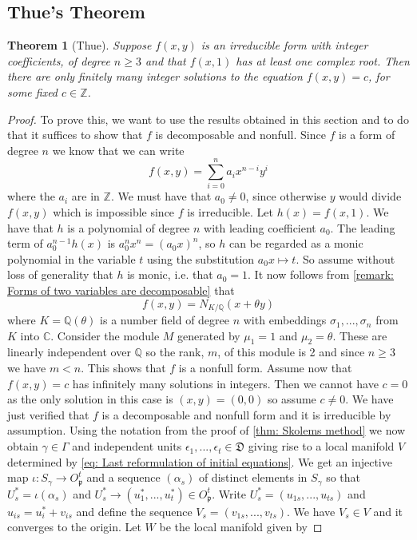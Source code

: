\documentclass{article}
\newtheorem{theorem}{Theorem}[section]
\newcommand{\mfrak}[1]{\mathfrak{#1}}
\newcommand{\mbb}[1]{\mathbb{#1}}
\numberwithin{equation}{section}
\begin{document}

\subsection{Thue's Theorem}

\begin{theorem}[Thue]\label{thm: Thues theorem}
    Suppose $f(x,y)$ is an irreducible form with integer coefficients, of degree $n \geq 3$ and that $f(x,1)$ has at least one complex root. Then there are only finitely many integer solutions to the equation $f(x,y) = c$, for some fixed $c \in \mbb{Z}$.
\end{theorem}
\begin{proof}
    To prove this, we want to use the results obtained in this section and to do that it suffices to show that $f$ is decomposable and nonfull. Since $f$ is a form of degree $n$ we know that we can write
    $$f(x,y) = \sum_{i = 0}^n a_i x^{n-i} y^{i}$$
    where the $a_i$ are in $\mbb Z$. We must have that $a_0 \neq 0$, since otherwise $y$ would divide $f(x,y)$ which is impossible since $f$ is irreducible. Let $h(x) = f(x,1)$. We have that $h$ is a polynomial of degree $n$ with leading coefficient $a_0$. The leading term of $a_0^{n-1} h(x)$ is $a_0^nx^n = (a_0 x)^n$, so $h$ can be regarded as a monic polynomial in the variable $t$ using the substitution $a_0 x \mapsto t$. So assume without loss of generality that $h$ is monic, i.e. that $a_0 = 1$. It now follows from \cref{remark: Forms of two variables are decomposable} that
    \begin{equation}\label{eq: f(x,y) is a norm form}
        f(x, y) = N_{K / \mbb Q}(x + \theta y)
    \end{equation}
    where $K = \mbb Q(\theta)$ is a number field of degree $n$ with embeddings $\sigma_1, ..., \sigma_n$ from $K$ into $\mbb C$. Consider the module $M$ generated by $\mu_1 = 1$ and $\mu_2 = \theta$. These are linearly independent over $\mbb Q$ so the rank, $m$, of this module is 2 and since $n \geq 3$ we have $m < n$. This shows that $f$ is a nonfull form. Assume now that $f(x,y) = c$ has infinitely many solutions in integers. Then we cannot have $c = 0$ as the only solution in this case is $(x,y) = (0,0)$ so assume $c \neq 0$. We have just verified that $f$ is a decomposable and nonfull form and it is irreducible by assumption. Using the notation from the proof of \cref{thm: Skolems method} we now obtain $\gamma \in \Gamma$ and independent units $\epsilon_1, ..., \epsilon_t \in \mfrak D$ giving rise to a local manifold $V$ determined by \cref{eq: Last reformulation of initial equations}. We get an injective map $\iota : S_\gamma \to O_\mfrak p^t$ and a sequence $(\alpha_s)$ of distinct elements in $S_\gamma$ so that $U^*_s = \iota(\alpha_s)$ and $U^*_s \to (u_1^*, ..., u_t^*) \in O_\mfrak p^t$. Write $U^*_s = (u_{1s}, ..., u_{ts})$ and $u_{is} = u_i^* + v_{is}$ and define the sequence $V_s = (v_{1s}, ..., v_{ts})$. We have $V_s \in V$ and it converges to the origin. Let $W$ be the local manifold given by

\end{proof}
\end{document}
